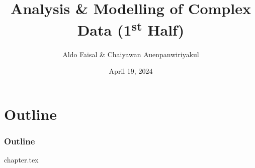 \documentclass{beamer}
\title{Analysis \& Modelling of Complex Data (1\textsuperscript{st} Half)}
\author{Aldo Faisal \& Chaiyawan Auenpanwiriyakul}
\institute{Universität Bayreuth}
\date{April 19, 2024}
\begin{document}
\frame{\titlepage}

\section{Outline}
\begin{frame}[allowframebreaks]
\frametitle{Outline}
\tableofcontents
\end{frame}

{chapter.tex}


\end{document}

